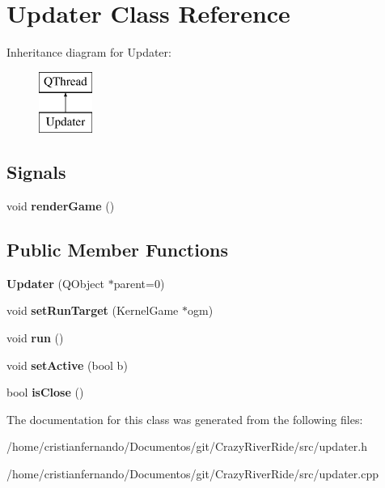 \hypertarget{class_updater}{\section{Updater Class Reference}
\label{class_updater}
}
Inheritance diagram for Updater\-:\begin{figure}[H]
\begin{center}
\leavevmode
\includegraphics[height=2.000000cm]{class_updater}
\end{center}
\end{figure}
\subsection*{Signals}
\begin{DoxyCompactItemize}
\item 
\hypertarget{class_updater_aa443259cbce530ab39679cbe0220ad55}{void {\bfseries render\-Game} ()}\label{class_updater_aa443259cbce530ab39679cbe0220ad55}

\end{DoxyCompactItemize}
\subsection*{Public Member Functions}
\begin{DoxyCompactItemize}
\item 
\hypertarget{class_updater_adb60a473bc174de0ee06ee09c814e1a2}{{\bfseries Updater} (Q\-Object $\ast$parent=0)}\label{class_updater_adb60a473bc174de0ee06ee09c814e1a2}

\item 
\hypertarget{class_updater_a98324b20b804c73f2cb33fc01afd29fb}{void {\bfseries set\-Run\-Target} (Kernel\-Game $\ast$ogm)}\label{class_updater_a98324b20b804c73f2cb33fc01afd29fb}

\item 
\hypertarget{class_updater_abd76987a878910ff4687cac6cd63859d}{void {\bfseries run} ()}\label{class_updater_abd76987a878910ff4687cac6cd63859d}

\item 
\hypertarget{class_updater_aa115005ac2d83eead9c9ffd00a2faae7}{void {\bfseries set\-Active} (bool b)}\label{class_updater_aa115005ac2d83eead9c9ffd00a2faae7}

\item 
\hypertarget{class_updater_a055c8c65e3a0d7bd5af22f51f0541ba2}{bool {\bfseries is\-Close} ()}\label{class_updater_a055c8c65e3a0d7bd5af22f51f0541ba2}

\end{DoxyCompactItemize}


The documentation for this class was generated from the following files\-:\begin{DoxyCompactItemize}
\item 
/home/cristianfernando/\-Documentos/git/\-Crazy\-River\-Ride/src/updater.\-h\item 
/home/cristianfernando/\-Documentos/git/\-Crazy\-River\-Ride/src/updater.\-cpp\end{DoxyCompactItemize}
